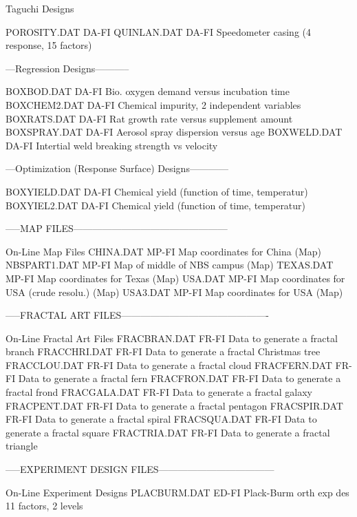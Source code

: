 Taguchi Designs

POROSITY.DAT                DA-FI 
QUINLAN.DAT                 DA-FI Speedometer casing (4 response, 15 factors)

---Regression Designs-----------

BOXBOD.DAT                  DA-FI Bio. oxygen demand versus incubation time
BOXCHEM2.DAT                DA-FI Chemical impurity, 2 independent variables
BOXRATS.DAT                 DA-FI Rat growth rate versus supplement amount
BOXSPRAY.DAT                DA-FI Aerosol spray dispersion versus age
BOXWELD.DAT                 DA-FI Intertial weld breaking strength vs velocity

---Optimization (Response Surface) Designs------------

BOXYIELD.DAT                DA-FI Chemical yield (function of time, temperatur)
BOXYIEL2.DAT                DA-FI Chemical yield (function of time, temperatur)

-----MAP FILES------------------------------------------------

On-Line Map Files
CHINA.DAT                   MP-FI Map coordinates for China (Map)
NBSPART1.DAT                MP-FI Map of middle of NBS campus (Map)
TEXAS.DAT                   MP-FI Map coordinates for Texas (Map)
USA.DAT                     MP-FI Map coordinates for USA (crude resolu.) (Map)
USA3.DAT                    MP-FI Map coordinates for USA (Map)

-----FRACTAL ART FILES----------------------------------------------

On-Line Fractal Art Files
FRACBRAN.DAT                FR-FI Data to generate a fractal branch
FRACCHRI.DAT                FR-FI Data to generate a fractal Christmas tree
FRACCLOU.DAT                FR-FI Data to generate a fractal cloud
FRACFERN.DAT                FR-FI Data to generate a fractal fern
FRACFRON.DAT                FR-FI Data to generate a fractal frond
FRACGALA.DAT                FR-FI Data to generate a fractal galaxy
FRACPENT.DAT                FR-FI Data to generate a fractal pentagon
FRACSPIR.DAT                FR-FI Data to generate a fractal spiral
FRACSQUA.DAT                FR-FI Data to generate a fractal square
FRACTRIA.DAT                FR-FI Data to generate a fractal triangle


-----EXPERIMENT DESIGN FILES------------------------------------

On-Line Experiment Designs
PLACBURM.DAT                ED-FI Plack-Burm orth exp des 11 factors, 2 levels

